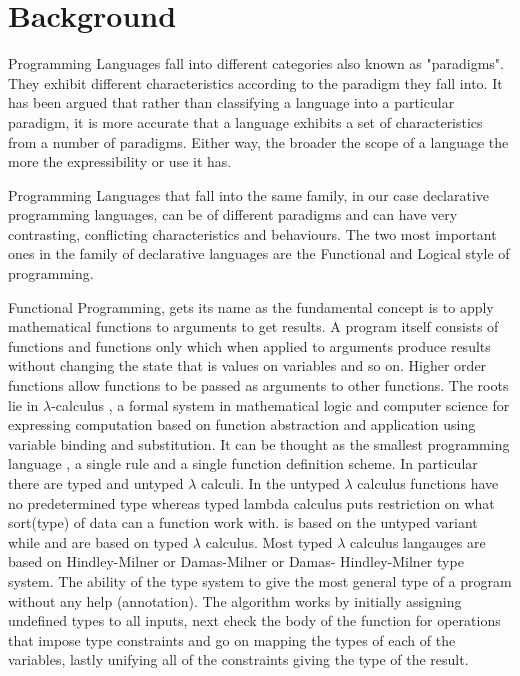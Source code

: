 \documentclass[proposal.tex]{subfiles}
\begin{document}
\chapter{Background}\label{chap:background}

Programming Languages fall into different categories also known as "paradigms". They exhibit different 
characteristics according to the paradigm they fall into. It has been argued 
\cite{Krishnamurthi:2008:TPL:1480828.1480846} that rather than classifying a language into a particular paradigm, it 
is more accurate that a language exhibits a set of characteristics from a number of paradigms. Either way, the 
broader the scope of a language the more the expressibility or use it has.  

\par Programming Languages that fall into the same family, in our case declarative programming languages, can 
be of different paradigms and can have very contrasting, conflicting characteristics and behaviours. The two most 
important ones in the family of declarative languages are the Functional and Logical style of programming.

\par Functional Programming, \cite{hughes1989functional} gets its name as the fundamental concept is to apply 
mathematical functions to arguments to get results. A program itself consists of functions and functions only which 
when applied to arguments produce results without changing the state that is values on variables and so on. Higher 
order functions allow functions to be passed as arguments to other functions. The roots lie in $\lambda$-calculus 
\cite{website:lambdacalculuswiki}, a formal system in mathematical logic and computer science for expressing 
computation based on function abstraction and application using variable binding and substitution.  It can be 
thought as the smallest programming language \cite{rojas2004tutorial}, a single rule and a single function 
definition scheme. In particular there are typed and untyped $\lambda$ calculi. In the untyped $\lambda$ calculus 
functions have no predetermined type whereas typed lambda calculus puts restriction on what sort(type) of data 
can a function work with.  is based on the untyped variant while  and 
 are based on typed $\lambda$ calculus. Most typed $\lambda$ calculus langauges are based 
on Hindley-Milner or Damas-Milner or Damas- Hindley-Milner \cite{website:hdmtypesystemwiki} type system. 
The ability of the type system to give the most general type of a program without any help (annotation).  The 
algorithm \cite{website:hdmtypesystem} works by initially assigning undefined types to all inputs, next check the 
body of the function for operations that impose type constraints and go on mapping the types of each of the 
variables, lastly unifying all of the constraints giving the type of the result. 
\end{document}
